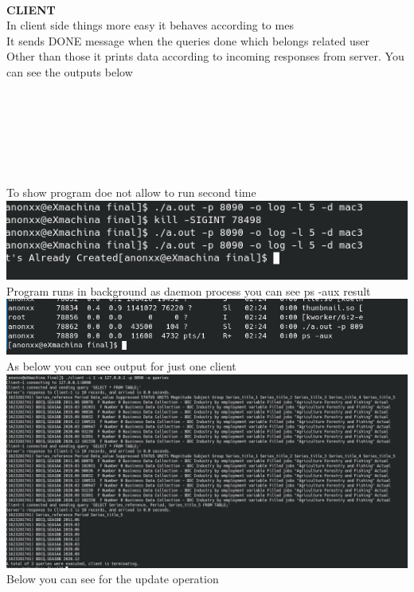 \documentclass{report}
\begin{document}
{    \\\large  \textbf{CLIENT}\\In client side things more easy it behaves according to mes\\ It sends DONE message when the queries done which belongs related user\\ Other than those it prints data according to incoming responses from server.
    You can see the outputs below\\\\
}



{\large  \\  }
\\\\\\\\
To show program doe not allow to run second time\\
\includegraphics[width=\textwidth,height=\textheight,keepaspectratio]{images/doubleins.png} \\
Program runs in background as daemon process you can see ps -aux result\\
\includegraphics[width=\textwidth,height=\textheight,keepaspectratio]{images/deamon.png}\\As below you can see output for just one client\\
\includegraphics[width=\textwidth,height=\textheight,keepaspectratio]{images/clientout.png}\\Below you can see for the update operation\\
\end{document}
